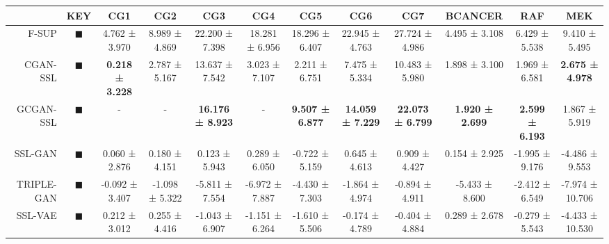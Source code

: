 \begin{tabular}{rccccccccccc}
\toprule
{} &                                                                   KEY &                     CG1 &                     CG2 &                      CG3 &                     CG4 &                     CG5 &                      CG6 &                      CG7 &                 BCANCER &                     RAF &                     MEK \\
\midrule
F-SUP      &        \textcolor{FULLY_SUPERVISED_CLASSIFIER}{\LARGE $\blacksquare$} &           4.762 ± 3.970 &           8.989 ± 4.869 &           22.200 ± 7.398 &          18.281 ± 6.956 &          18.296 ± 6.407 &           22.945 ± 4.763 &           27.724 ± 4.986 &           4.495 ± 3.108 &           6.429 ± 5.538 &           9.410 ± 5.495 \\
CGAN-SSL   &   \textcolor{CGAN_BASIC_SUPERVISED_CLASSIFIER}{\LARGE $\blacksquare$} &  \textbf{0.218 ± 3.228} &           2.787 ± 5.167 &           13.637 ± 7.542 &           3.023 ± 7.107 &           2.211 ± 6.751 &            7.475 ± 5.334 &           10.483 ± 5.980 &           1.898 ± 3.100 &           1.969 ± 6.581 &  \textbf{2.675 ± 4.978} \\
GCGAN-SSL  &  \textcolor{CGAN_GUMBEL_SUPERVISED_CLASSIFIER}{\LARGE $\blacksquare$} &                       - &                       - &  \textbf{16.176 ± 8.923} &                       - &  \textbf{9.507 ± 6.877} &  \textbf{14.059 ± 7.229} &  \textbf{22.073 ± 6.799} &  \textbf{1.920 ± 2.699} &  \textbf{2.599 ± 6.193} &           1.867 ± 5.919 \\
SSL-GAN    &                            \textcolor{SSL_GAN}{\LARGE $\blacksquare$} &           0.060 ± 2.876 &           0.180 ± 4.151 &            0.123 ± 5.943 &           0.289 ± 6.050 &          -0.722 ± 5.159 &            0.645 ± 4.613 &            0.909 ± 4.427 &           0.154 ± 2.925 &          -1.995 ± 9.176 &          -4.486 ± 9.553 \\
TRIPLE-GAN &                         \textcolor{TRIPLE_GAN}{\LARGE $\blacksquare$} &          -0.092 ± 3.407 &          -1.098 ± 5.322 &           -5.811 ± 7.554 &          -6.972 ± 7.887 &          -4.430 ± 7.303 &           -1.864 ± 4.974 &           -0.894 ± 4.911 &          -5.433 ± 8.600 &          -2.412 ± 6.549 &         -7.974 ± 10.706 \\
SSL-VAE    &                            \textcolor{SSL_VAE}{\LARGE $\blacksquare$} &           0.212 ± 3.012 &           0.255 ± 4.416 &           -1.043 ± 6.907 &          -1.151 ± 6.264 &          -1.610 ± 5.506 &           -0.174 ± 4.789 &           -0.404 ± 4.884 &           0.289 ± 2.678 &          -0.279 ± 5.543 &         -4.433 ± 10.530 \\

\end{tabular}
